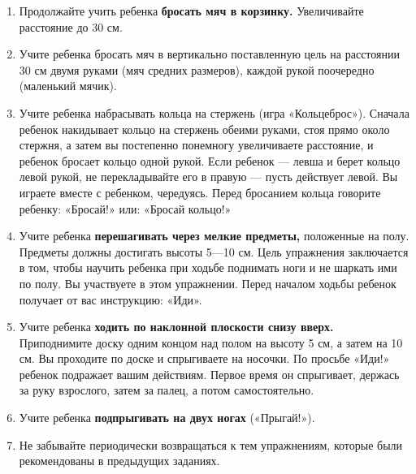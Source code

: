 \documentclass{book}
\begin{document}
\begin{enumerate}
\def\labelenumi{\arabic{enumi}.}
\item
  
  Продолжайте учить ребенка \textbf{бросать мяч в корзинку.}
  Увеличивайте расстояние до 30 см.
  
\item
  
  Учите ребенка бросать мяч в вертикально поставленную цель на
  расстоянии 30 см двумя руками (мяч средних размеров), каждой рукой
  поочередно (маленький мячик).
  
\item
  
  Учите ребенка набрасывать кольца на стержень (игра «Кольцеброс»).
  Сначала ребенок накидывает кольцо на стержень обеими руками, стоя
  прямо около стержня, а затем вы постепенно понемногу увеличиваете
  расстояние, и ребенок бросает кольцо одной рукой. Если ребенок ---
  левша и берет кольцо левой рукой, не перекладывайте его в правую ---
  пусть действует левой. Вы играете вместе с ребенком, чередуясь. Перед
  бросанием кольца говорите ребенку: «Бросай!» или: «Бросай кольцо!»
  
\item
  
  Учите ребенка \textbf{перешагивать через мелкие предметы,} положенные
  на полу. Предметы должны достигать высоты 5---10 см. Цель упражнения
  заключается в том, чтобы научить ребенка при ходьбе поднимать ноги и
  не шаркать ими по полу. Вы участвуете в этом упражнении. Перед началом
  ходьбы ребенок получает от вас инструкцию: «Иди».
  
\item
  
  Учите ребенка \textbf{ходить по наклонной плоскости снизу вверх.}
  Приподнимите доску одним концом над полом на высоту 5 см, а затем на
  10 см. Вы проходите по доске и спрыгиваете на носочки. По просьбе
  «Иди!» ребенок подражает вашим действиям. Первое время он спрыгивает,
  держась за руку взрослого, затем за палец, а потом самостоятельно.
  
\item
  
  Учите ребенка \textbf{подпрыгивать на двух ногах} («Прыгай!»).
  
\item
  
  Не забывайте периодически возвращаться к тем упражнениям, которые были
  рекомендованы в предыдущих заданиях.
  
\end{enumerate}
\end{document}
